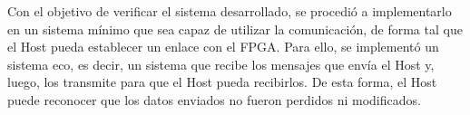 
%
%
%	
%	
Con el objetivo de verificar el sistema desarrollado, se procedió a implementarlo en un sistema mínimo que sea capaz de utilizar la comunicación, de forma tal que el Host pueda establecer un enlace con el FPGA. Para ello, se implementó un sistema eco, es decir, un sistema que recibe los mensajes que envía el Host y, luego, los transmite para que el Host pueda recibirlos. De esta forma, el Host puede reconocer que los datos enviados no fueron perdidos ni modificados.

